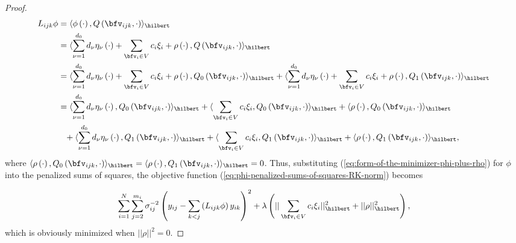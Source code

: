 \begin{proof}
\begin{align*}
L_{ijk} \phi &= \langle \phi\left(\cdot\right), Q\left(\bfv_{ijk}, \cdot\right) \rangle_\hilbert \\
&=  \langle  \sum_{\nu = 1}^{d_0} d_\nu \eta_\nu\left(\cdot\right) + \sum_{\bfv_{i} \in V} c_i \xi_i + \rho\left(\cdot\right), Q\left(\bfv_{ijk}, \cdot\right) \rangle_\hilbert \\
&= \langle  \sum_{\nu = 1}^{d_0} d_\nu \eta_\nu\left(\cdot\right) + \sum_{\bfv_{i} \in V} c_i \xi_i + \rho\left(\cdot\right), Q_0\left(\bfv_{ijk}, \cdot\right) \rangle_\hilbert + \langle \sum_{\nu = 1}^{d_0} d_\nu \eta_\nu\left(\cdot\right) + \sum_{\bfv_{i} \in V} c_i \xi_i + \rho\left(\cdot\right), Q_1\left(\bfv_{ijk}, \cdot\right) \rangle_\hilbert \\
&=  \langle  \sum_{\nu = 1}^{d_0} d_\nu \eta_\nu\left(\cdot\right) ,  Q_0\left(\bfv_{ijk}, \cdot\right) \rangle_\hilbert +  \langle   \sum_{\bfv_{i} \in V} c_i \xi_i  ,  Q_0\left(\bfv_{ijk}, \cdot\right) \rangle_\hilbert + \langle \rho\left(\cdot\right), Q_0\left(\bfv_{ijk}, \cdot\right) \rangle_\hilbert \\ 
&\phantom{=} + \langle  \sum_{\nu = 1}^{d_0} d_\nu \eta_\nu\left(\cdot\right) ,  Q_1\left(\bfv_{ijk}, \cdot\right) \rangle_\hilbert +  \langle   \sum_{\bfv_{i} \in V} c_i \xi_i  ,  Q_1\left(\bfv_{ijk}, \cdot\right) \rangle_\hilbert + \langle \rho\left(\cdot\right), Q_1\left(\bfv_{ijk}, \cdot\right) \rangle_\hilbert, 
\end{align*}
\noindent
where $\langle \rho\left(\cdot\right), Q_0\left(\bfv_{ijk}, \cdot\right) \rangle_\hilbert = \langle \rho\left(\cdot\right), Q_1\left(\bfv_{ijk}, \cdot\right) \rangle_\hilbert = 0$. Thus, substituting (\ref{eq:form-of-the-minimizer-phi-plus-rho}) for $\phi$ into the penalized sums of squares, the objective function (\ref{eq:phi-penalized-sums-of-squares-RK-norm}) becomes

\begin{equation*} 
\sum_{i=1}^N \sum_{j=2}^{m_i} \sigma^{-2}_{ij}\left( y_{ij} - \sum_{k<j}\left( L_{ijk}\phi\right) y_{ik}  \right)^2 + \lambda \left(\vert \vert \sum_{\bfv_i \in V} c_i \xi_i \vert \vert_\hilbert^2 + \vert \vert \rho \vert \vert_\hilbert^2\right),
\end{equation*} 
\noindent
which is obviously minimized when $\vert \vert \rho \vert \vert^2 = 0$.
 
\end{proof}
 
